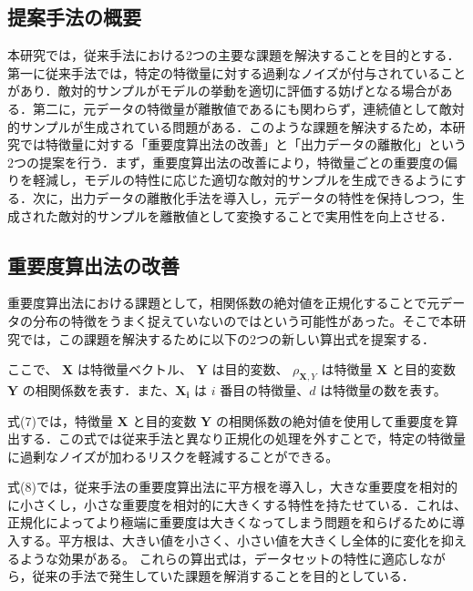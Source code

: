 \subsection{提案手法の概要}
本研究では，従来手法における2つの主要な課題を解決することを目的とする．第一に従来手法では，特定の特徴量に対する過剰なノイズが付与されていることがあり．敵対的サンプルがモデルの挙動を適切に評価する妨げとなる場合がある．第二に，元データの特徴量が離散値であるにも関わらず，連続値として敵対的サンプルが生成されている問題がある．このような課題を解決するため，本研究では特徴量に対する「重要度算出法の改善」と「出力データの離散化」という2つの提案を行う．まず，重要度算出法の改善により，特徴量ごとの重要度の偏りを軽減し，モデルの特性に応じた適切な敵対的サンプルを生成できるようにする．次に，出力データの離散化手法を導入し，元データの特性を保持しつつ，生成された敵対的サンプルを離散値として変換することで実用性を向上させる．

\subsection{重要度算出法の改善}
重要度算出法における課題として，相関係数の絶対値を正規化することで元データの分布の特徴をうまく捉えていないのではという可能性があった。そこで本研究では，この課題を解決するために以下の2つの新しい算出式を提案する．


ここで、 $\bm{X}$ は特徴量ベクトル、 $\bm{Y}$ は目的変数、 $\rho_{\bm{X},Y}$ は特徴量 $\bm{X}$ と目的変数 $\bm{Y}$ の相関係数を表す．また、$\bm{X_i}$ は $i$ 番目の特徴量、$d$ は特徴量の数を表す。

式(7)では，特徴量 $\bm{X}$ と目的変数 $\bm{Y}$ の相関係数の絶対値を使用して重要度を算出する．この式では従来手法と異なり正規化の処理を外すことで，特定の特徴量に過剰なノイズが加わるリスクを軽減することができる。

式(8)では，従来手法の重要度算出法に平方根を導入し，大きな重要度を相対的に小さくし，小さな重要度を相対的に大きくする特性を持たせている．これは、正規化によってより極端に重要度は大きくなってしまう問題を和らげるために導入する。平方根は、大きい値を小さく、小さい値を大きくし全体的に変化を抑えるような効果がある。
これらの算出式は，データセットの特性に適応しながら，従来の手法で発生していた課題を解消することを目的としている．

